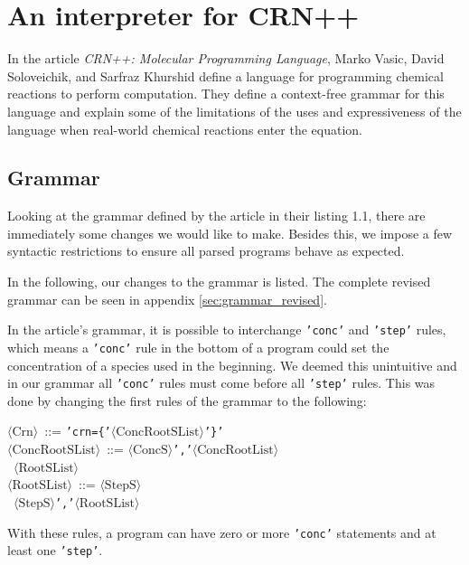 \section{An interpreter for CRN++}

In the article \textit{CRN++: Molecular Programming Language}, Marko Vasic, David Soloveichik, and Sarfraz Khurshid define a language for programming chemical reactions to perform computation. They define a context-free grammar for this language and explain some of the limitations of the uses and expressiveness of the language when real-world chemical reactions enter the equation. 


\subsection{Grammar}\label{sec:grammar}

Looking at the grammar defined by the article in their listing 1.1, there are immediately some changes we would like to make. Besides this, we impose a few syntactic restrictions to ensure all parsed programs behave as expected. 

In the following, our changes to the grammar is listed. The complete revised grammar can be seen in appendix \ref{sec:grammar_revised}. 

In the article's grammar, it is possible to interchange \texttt{'conc'} and \texttt{'step'} rules, which means a \texttt{'conc'} rule in the bottom of a program could set the concentration of a species used in the beginning. We deemed this unintuitive and in our grammar all \texttt{'conc'} rules must come before all \texttt{'step'} rules. This was done by changing the first rules of the grammar to the following:
\begin{tabbing}
    $\langle \text{Crn} \rangle$ \,::=\; \= \texttt{'crn=\{'$\langle \text{ConcRootSList} \rangle$'\}'} \\
    
    $\langle \text{ConcRootSList} \rangle$ \,::=\;  $\langle \text{ConcS} \rangle$\texttt{','}$\langle \text{ConcRootList} \rangle$ \\
    \>\textbar \, $\langle \text{RootSList} \rangle$ \\

    $\langle \text{RootSList} \rangle$ \,::=\;  $\langle \text{StepS} \rangle$ \\
    \>\textbar \, $\langle \text{StepS} \rangle$\texttt{','}$\langle \text{RootSList} \rangle$
\end{tabbing}
With these rules, a program can have zero or more \texttt{'conc'} statements and at least one \texttt{'step'}. 

